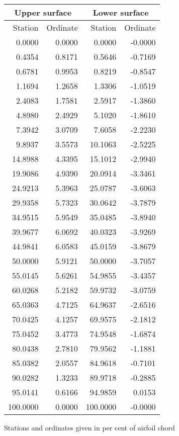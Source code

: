\documentclass[11pt]{book}
\begin{document}
 \hspace{4mm}
 \begin{tabular}{|r|r|r|r|} \hline 
 \multicolumn{2}{|c|}{Upper surface} & \multicolumn{2}{|c|}{Lower surface} \\
 \hline
 Station & Ordinate & Station & Ordinate \\
 \hline
0.0000 & 0.0000 & 0.0000 & -0.0000 \\
0.4354 & 0.8171 & 0.5646 & -0.7169 \\
0.6781 & 0.9953 & 0.8219 & -0.8547 \\
1.1694 & 1.2658 & 1.3306 & -1.0519 \\
2.4083 & 1.7581 & 2.5917 & -1.3860 \\
4.8980 & 2.4929 & 5.1020 & -1.8610 \\
7.3942 & 3.0709 & 7.6058 & -2.2230 \\
9.8937 & 3.5573 & 10.1063 & -2.5225 \\
14.8988 & 4.3395 & 15.1012 & -2.9940 \\
19.9086 & 4.9390 & 20.0914 & -3.3461 \\
24.9213 & 5.3963 & 25.0787 & -3.6063 \\
29.9358 & 5.7323 & 30.0642 & -3.7879 \\
34.9515 & 5.9549 & 35.0485 & -3.8940 \\
39.9677 & 6.0692 & 40.0323 & -3.9269 \\
44.9841 & 6.0583 & 45.0159 & -3.8679 \\
50.0000 & 5.9121 & 50.0000 & -3.7057 \\
55.0145 & 5.6261 & 54.9855 & -3.4357 \\
60.0268 & 5.2182 & 59.9732 & -3.0759 \\
65.0363 & 4.7125 & 64.9637 & -2.6516 \\
70.0425 & 4.1257 & 69.9575 & -2.1812 \\
75.0452 & 3.4773 & 74.9548 & -1.6874 \\
80.0438 & 2.7810 & 79.9562 & -1.1881 \\
85.0382 & 2.0557 & 84.9618 & -0.7101 \\
90.0282 & 1.3233 & 89.9718 & -0.2885 \\
95.0141 & 0.6166 & 94.9859 & 0.0153 \\
100.0000 & 0.0000 & 100.0000 & -0.0000 \\
 \hline 
 \end{tabular}
 \vspace{8mm}

Stations and ordinates given in per cent of airfoil chord
\end{document}
